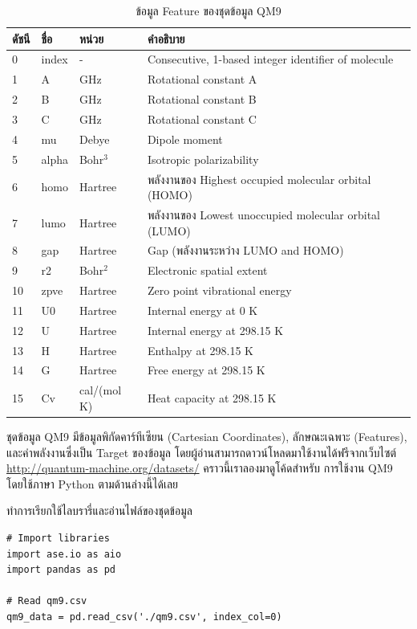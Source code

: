 \begin{table}[htbp]
    \centering
    \caption{ข้อมูล Feature ของชุดข้อมูล QM9}
    \label{tab:qm9_feature}
    \small
    \begin{tabular}{llll}\toprule
    \textbf{ดัชนี} &\textbf{ชื่อ} &\textbf{หน่วย} &\textbf{คำอธิบาย} \\\midrule
    0 &index &- &Consecutive, 1-based integer identifier of molecule \\
    1 &A &GHz &Rotational constant A \\
    2 &B &GHz &Rotational constant B \\
    3 &C &GHz &Rotational constant C \\
    4 &mu &Debye &Dipole moment \\
    5 &alpha &Bohr$^3$ &Isotropic polarizability \\
    6 &homo &Hartree &พลังงานของ Highest occupied molecular orbital (HOMO) \\
    7 &lumo &Hartree &พลังงานของ Lowest unoccupied molecular orbital (LUMO) \\
    8 &gap &Hartree &Gap (พลังงานระหว่าง LUMO and HOMO) \\
    9 &r2 &Bohr$^2$ &Electronic spatial extent \\
    10 &zpve &Hartree &Zero point vibrational energy \\
    11 &U0 &Hartree &Internal energy at 0 K \\
    12 &U &Hartree &Internal energy at 298.15 K \\
    13 &H &Hartree &Enthalpy at 298.15 K \\
    14 &G &Hartree &Free energy at 298.15 K \\
    15 &Cv &cal/(mol K) &Heat capacity at 298.15 K \\
    \bottomrule
    \end{tabular}
\end{table}

ชุดข้อมูล QM9 มีข้อมูลพิกัดคาร์ทีเซียน (Cartesian Coordinates), ลักษณะเฉพาะ (Features), และค่าพลังงานซึ่งเป็น Target ของข้อมูล 
โดยผู้อ่านสามารถดาวน์โหลดมาใช้งานได้ฟรีจากเว็บไซต์ \url{http://quantum-machine.org/datasets/} คราวนี้เราลองมาดูโค้ดสำหรับ%
การใช้งาน QM9 โดยใช้ภาษา Python ตามด้านล่างนี้ได้เลย

\noindent ทำการเรียกใช้ไลบรารี่และอ่านไฟล์ของชุดข้อมูล

\begin{lstlisting}[style=MyPython]
# Import libraries
import ase.io as aio
import pandas as pd

# Read qm9.csv
qm9_data = pd.read_csv('./qm9.csv', index_col=0)
\end{lstlisting}

